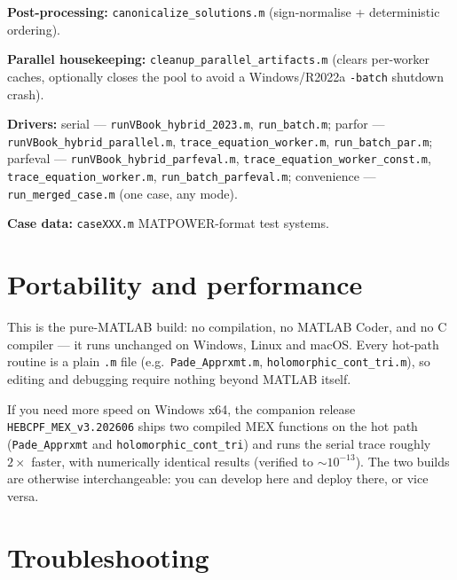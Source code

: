 \documentclass[11pt,a4paper]{article}
\newcommand{\code}[1]{\texttt{#1}}
\begin{document}
\textbf{Post-processing:} \code{canonicalize_solutions.m} (sign-normalise + deterministic
ordering).

\textbf{Parallel housekeeping:} \code{cleanup_parallel_artifacts.m} (clears per-worker
caches, optionally closes the pool to avoid a Windows/R2022a \code{-batch} shutdown
crash).

\textbf{Drivers:}
serial --- \code{runVBook_hybrid_2023.m}, \code{run_batch.m};
parfor --- \code{runVBook_hybrid_parallel.m}, \code{trace_equation_worker.m},
\code{run_batch_par.m};
parfeval --- \code{runVBook_hybrid_parfeval.m}, \code{trace_equation_worker_const.m},
\code{trace_equation_worker.m}, \code{run_batch_parfeval.m};
convenience --- \code{run_merged_case.m} (one case, any mode).

\textbf{Case data:} \code{caseXXX.m} MATPOWER-format test systems.

\section{Portability and performance}

This is the pure-MATLAB build: no compilation, no MATLAB Coder, and no C compiler --- it
runs unchanged on Windows, Linux and macOS. Every hot-path routine is a plain \code{.m}
file (e.g.\ \code{Pade_Apprxmt.m}, \code{holomorphic_cont_tri.m}), so editing and
debugging require nothing beyond MATLAB itself.

If you need more speed on Windows x64, the companion release \code{HEBCPF_MEX_v3.202606}
ships two compiled MEX functions on the hot path (\code{Pade_Apprxmt} and
\code{holomorphic_cont_tri}) and runs the serial trace roughly $2\times$ faster, with
numerically identical results (verified to $\sim 10^{-13}$). The two builds are otherwise
interchangeable: you can develop here and deploy there, or vice versa.

\section{Troubleshooting}
\end{document}
